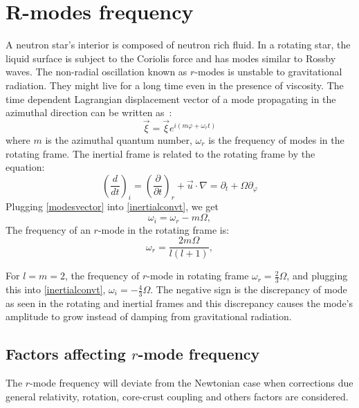 \documentclass{ttuthes2007}
\begin{document}
\section{R-modes frequency}
A neutron star's interior is composed of neutron rich fluid. In a rotating
star, the liquid surface is subject to the Coriolis force and has modes similar to Rossby
waves. The non-radial oscillation known as $r$-modes is unstable to
gravitational radiation. They might live for a long time even in the presence of
viscosity.
The time dependent Lagrangian displacement vector of a mode propagating
in the azimuthal direction can be written as~\cite{ANDERSSON_2001}:
\begin{equation}\label{modesvector}
\vec{\xi}= \vec{\xi} e^{i(m\varphi+\omega_r t)}
\end{equation}
where $m$ is the azimuthal quantum number, $\omega_r$ is the frequency of modes in
the rotating frame.
The inertial frame is related to the rotating frame by the equation:
\begin{equation}\label{inertialconvt}
\left(\frac{d}{dt}\right)_i=\left(\frac{\partial}{\partial
t}\right)_r+\vec{u}\cdot\nabla=\partial_t+ \Omega
\partial_\varphi
\end{equation}
Plugging \ref{modesvector} into \ref{inertialconvt}, we get
\begin{equation}
\omega_i=\omega_r - m\Omega,
\end{equation}
The frequency of an $r$-mode in the rotating frame is:
\begin{equation}\label{rotatingframe}
\omega_r = \frac{2m\Omega}{l(l+1)},
\end{equation}

For $l=m=2$, the frequency of $r$-mode in rotating frame $\omega_r=\frac{2}{3}\Omega$, and plugging this into \ref{inertialconvt},
$\omega_i = -\frac{4}{3}\Omega$.
The negative sign is the discrepancy of mode as seen in the rotating and
inertial frames and this discrepancy causes the mode's amplitude to grow instead
of damping from gravitational radiation. 

\subsection{Factors affecting $r$-mode frequency}
The $r$-mode frequency will deviate from the Newtonian case when corrections due
general relativity, rotation, core-crust coupling and others factors are considered. 
\end{document}
